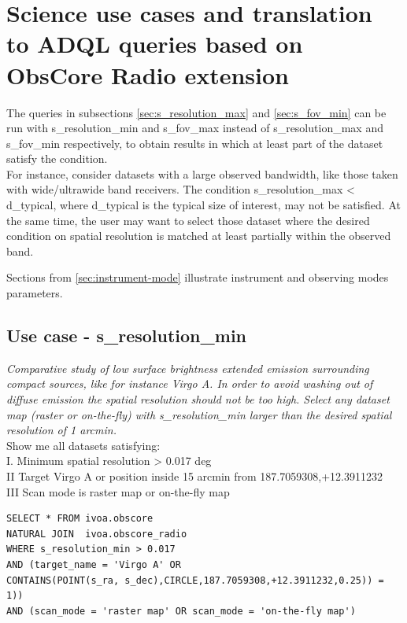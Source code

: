 \section{Science use cases and translation to ADQL queries  based on ObsCore Radio extension  }
\label{ADQLusecases}


The  queries in subsections \ref{sec:s_resolution_max} and \ref{sec:s_fov_min}
can be run with s\_resolution\_min and s\_fov\_max instead of s\_resolution\_max and 
 s\_fov\_min respectively, to obtain results in which at least part of the dataset satisfy the condition.\\
For instance, consider datasets with a large observed bandwidth, like those taken with wide/ultrawide band receivers.
The condition s\_resolution\_max < d\_typical, where d\_typical is the typical size of interest, may not be satisfied. At the same time, the user may want to select those 
dataset where the desired condition on spatial resolution is matched at least partially  within the observed band.

Sections from \ref{sec:instrument-mode} illustrate instrument and observing modes parameters.

\subsection{Use case - s\_resolution\_min}
\label{sec:s_resolution_min}
\textit{Comparative study of low surface brightness extended emission surrounding compact sources, like for instance Virgo A.
In order to avoid washing out of diffuse emission the spatial resolution should not be too high.
Select any dataset map (raster or on-the-fly) with s\_resolution\_min larger than the desired spatial resolution of 1 arcmin.}\\
Show me all datasets satisfying: \\
I. Minimum spatial resolution > 0.017 deg \\
II Target Virgo A or position inside 15 arcmin from 187.7059308,+12.3911232 \\
III Scan mode is raster map or on-the-fly map

\begin{verbatim}
SELECT * FROM ivoa.obscore
NATURAL JOIN  ivoa.obscore_radio 
WHERE s_resolution_min > 0.017 
AND (target_name = 'Virgo A' OR
CONTAINS(POINT(s_ra, s_dec),CIRCLE,187.7059308,+12.3911232,0.25)) = 1)) 
AND (scan_mode = 'raster map' OR scan_mode = 'on-the-fly map')
\end{verbatim}

